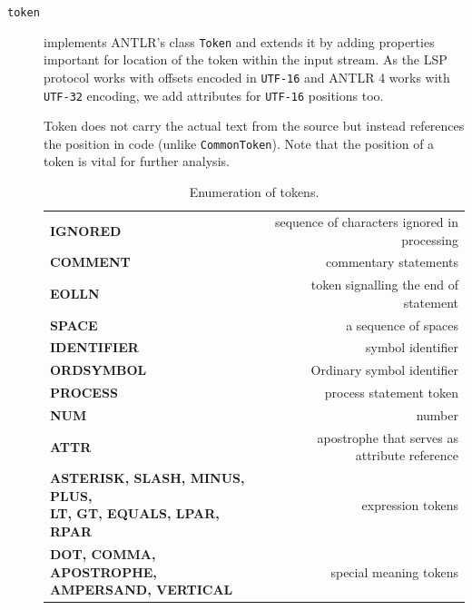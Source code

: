 \begin{description}
	
	\item[\texttt{token}] implements ANTLR's class \texttt{Token} and extends it by adding properties important for location of the token within the input stream. As the LSP protocol works with offsets encoded in \texttt{UTF-16} and ANTLR 4 works with \texttt{UTF-32} encoding, we add attributes for \texttt{UTF-16} positions too.
	
	Token does not carry the actual text from the source but instead references the position in code (unlike \texttt{CommonToken}). Note that the position of a token is vital for further analysis.
	
	\begin{table}
		\centering
		\begin{tabular}{lr}
			\toprule
			\textbf{IGNORED}                                                                     &  sequence of characters ignored in processing \\
			\textbf{COMMENT}                                                                     &                         commentary statements \\
			\textbf{EOLLN}                                                                       &         token signalling the end of statement \\
			\textbf{SPACE}                                                                       &                          a sequence of spaces \\
			\textbf{IDENTIFIER}                                                                  &                             symbol identifier \\
			\textbf{ORDSYMBOL}                                                                   &                    Ordinary symbol identifier \\
			\textbf{PROCESS}                                                                     &                       process statement token \\
			\textbf{NUM}                                                                         &                                        number \\
			\textbf{ATTR}                                                                        & apostrophe that serves as attribute reference \\
			\thead{\textbf{ASTERISK, SLASH, MINUS, PLUS,}\\ \textbf{LT, GT, EQUALS, LPAR, RPAR}} &                             expression tokens \\
			\thead{\textbf{DOT, COMMA, APOSTROPHE,}\\ \textbf{AMPERSAND, VERTICAL}}              &                        special meaning tokens \\ \bottomrule
		\end{tabular}
		\caption{Enumeration of tokens.}
		\label{tab06:tokens}
	\end{table}
	

\end{description}
